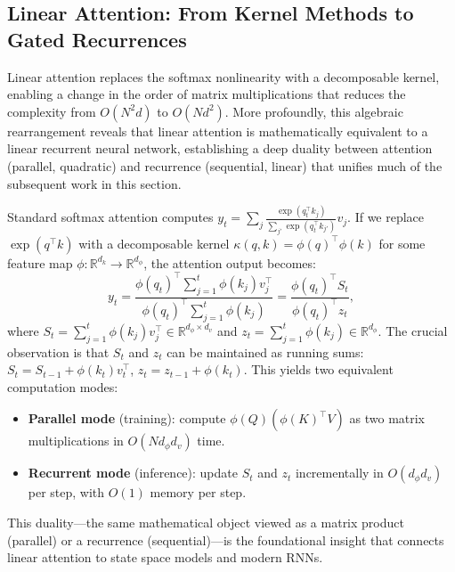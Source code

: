 \subsection{Linear Attention: From Kernel Methods to Gated Recurrences}
\label{subsec:linear-attn}

Linear attention replaces the softmax nonlinearity with a decomposable kernel, enabling a change in the order of matrix multiplications that reduces the complexity from $O(N^2 d)$ to $O(N d^2)$. More profoundly, this algebraic rearrangement reveals that linear attention is mathematically equivalent to a linear recurrent neural network, establishing a deep duality between attention (parallel, quadratic) and recurrence (sequential, linear) that unifies much of the subsequent work in this section.

Standard softmax attention computes $y_t = \sum_j \frac{\exp(q_t^\top k_j)}{\sum_{j'} \exp(q_t^\top k_{j'})} v_j$. If we replace $\exp(q^\top k)$ with a decomposable kernel $\kappa(q, k) = \phi(q)^\top \phi(k)$ for some feature map $\phi: \mathbb{R}^{d_k} \to \mathbb{R}^{d_\phi}$, the attention output becomes:
\begin{equation}
y_t = \frac{\phi(q_t)^\top \sum_{j=1}^{t} \phi(k_j) v_j^\top}{\phi(q_t)^\top \sum_{j=1}^{t} \phi(k_j)} = \frac{\phi(q_t)^\top S_t}{\phi(q_t)^\top z_t},
\label{eq:linear-attn}
\end{equation}
where $S_t = \sum_{j=1}^{t} \phi(k_j) v_j^\top \in \mathbb{R}^{d_\phi \times d_v}$ and $z_t = \sum_{j=1}^{t} \phi(k_j) \in \mathbb{R}^{d_\phi}$. The crucial observation is that $S_t$ and $z_t$ can be maintained as running sums: $S_t = S_{t-1} + \phi(k_t) v_t^\top$, $z_t = z_{t-1} + \phi(k_t)$. This yields two equivalent computation modes:
\begin{itemize}[nosep]
\item \textbf{Parallel mode} (training): compute $\phi(Q) (\phi(K)^\top V)$ as two matrix multiplications in $O(N d_\phi d_v)$ time.
\item \textbf{Recurrent mode} (inference): update $S_t$ and $z_t$ incrementally in $O(d_\phi d_v)$ per step, with $O(1)$ memory per step.
\end{itemize}
This duality---the same mathematical object viewed as a matrix product (parallel) or a recurrence (sequential)---is the foundational insight that connects linear attention to state space models and modern RNNs.

